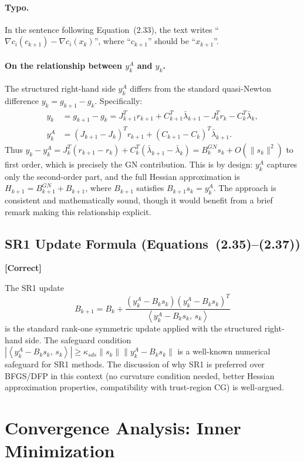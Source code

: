 \documentclass[11pt]{article}
\newcommand{\inner}[2]{\left\langle #1,\, #2 \right\rangle}
\newcommand{\statusok}{\textcolor{okcolor}{\textbf{[Correct]}}}
\theoremstyle{plain}
\begin{document}
\paragraph{Typo.} In the sentence following Equation~(2.33), the text writes ``$\nabla c_i(c_{k+1}) - \nabla c_i(x_k)$'', where ``$c_{k+1}$'' should be ``$x_{k+1}$''.

\paragraph{On the relationship between $y_k^A$ and $y_k$.} The structured right-hand side $y_k^A$ differs from the standard quasi-Newton difference $y_k = g_{k+1} - g_k$. Specifically:
\begin{align*}
y_k &= g_{k+1} - g_k = J_{k+1}^Tr_{k+1} + C_{k+1}^T\bar{\lambda}_{k+1} - J_k^Tr_k - C_k^T\bar{\lambda}_k, \\
y_k^A &= (J_{k+1} - J_k)^Tr_{k+1} + (C_{k+1} - C_k)^T\bar{\lambda}_{k+1}.
\end{align*}
Thus $y_k - y_k^A = J_k^T(r_{k+1} - r_k) + C_k^T(\bar{\lambda}_{k+1} - \bar{\lambda}_k) = B_k^{GN}s_k + O(\|s_k\|^2)$ to first order, which is precisely the GN contribution. This is by design: $y_k^A$ captures only the second-order part, and the full Hessian approximation is $H_{k+1} = B_{k+1}^{GN} + B_{k+1}$, where $B_{k+1}$ satisfies $B_{k+1}s_k = y_k^A$. The approach is consistent and mathematically sound, though it would benefit from a brief remark making this relationship explicit.

\subsection{SR1 Update Formula (Equations~(2.35)--(2.37))}
\statusok

The SR1 update
\[
B_{k+1} = B_k + \frac{(y_k^A - B_ks_k)(y_k^A - B_ks_k)^T}{\inner{y_k^A - B_ks_k}{s_k}}
\]
is the standard rank-one symmetric update applied with the structured right-hand side. The safeguard condition $|\inner{y_k^A - B_ks_k}{s_k}| \ge \kappa_{sds}\|s_k\|\|y_k^A - B_ks_k\|$ is a well-known numerical safeguard for SR1 methods. The discussion of why SR1 is preferred over BFGS/DFP in this context (no curvature condition needed, better Hessian approximation properties, compatibility with trust-region CG) is well-argued.


\section{Convergence Analysis: Inner Minimization}
\end{document}
